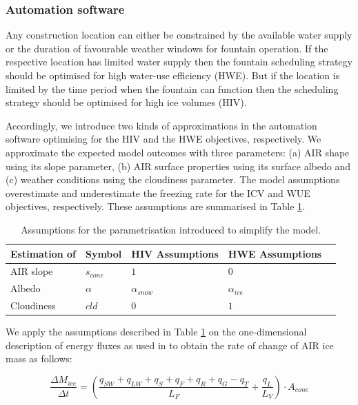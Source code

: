 \documentclass[tc, manuscript]{copernicus}
\begin{document}
\subsubsection{Automation software}

Any construction location can either be constrained by the available water supply or the duration of favourable
weather windows for fountain operation. If the respective location has limited water supply then the fountain
scheduling strategy should be optimised for high water-use efficiency (HWE). But if the location is limited by
the time period when the fountain can function then the scheduling strategy should be optimised for high ice
volumes (HIV).

Accordingly, we introduce two kinds of approximations in the automation software optimising for the HIV and the
HWE objectives, respectively. We approximate the expected model outcomes with three parameters: (a) AIR shape
using its slope parameter, (b) AIR surface properties using its surface albedo and (c) weather conditions using
the cloudiness parameter. The model assumptions overestimate and underestimate the freezing rate for the ICV and
WUE objectives, respectively. These assumptions are summarised in Table \ref{tab:assumptions}. 

\begin{table}[]
\centering
\caption{Assumptions for the parametrisation introduced to simplify the model.}
\label{tab:assumptions}
\begin{tabular}{@{}lllll@{}}
\toprule
\textbf{Estimation of} & \textbf{Symbol} & \textbf{HIV Assumptions} & \textbf{HWE Assumptions} & \\ \midrule
\multicolumn{1}{|l}{AIR slope}        & $s_{cone}$ & $ 1 $ & $0$ & \multicolumn{1}{l|}{} \\ \midrule
\multicolumn{1}{|l}{Albedo} & $\alpha$ & $\alpha_{snow}$ & $\alpha_{ice}$ & \multicolumn{1}{l|}{} \\\midrule 
\multicolumn{1}{|l}{Cloudiness}  & $cld$ & $0$ & $1$ & \multicolumn{1}{l|}{} \\ \bottomrule
\end{tabular}
\end{table}

We apply the assumptions described in Table \ref{tab:assumptions} on the one-dimensional description of energy
fluxes as used in \cite{balasubramanianInfluenceMeteorologicalConditions2022} to obtain the rate of change of
AIR ice mass as follows: 

\begin{equation}
  \frac{\Delta M_{ice}}{\Delta t}  =  (\frac{q_{SW} + q_{LW} + q_{S} + q_{F} + q_{R} + q_{G} - q_{T}}{L_F} + \frac{q_{L}}{L_V} ) \cdot A_{cone}
	\label{eqn:auto}
\end{equation}
\end{document}
